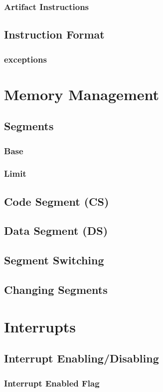 \documentclass[oneside, a4paper]{memoir}
\begin{document}
\subsection{Artifact Instructions}
\section{Instruction Format}
\subsection{exceptions}

\chapter{Memory Management}
\section{Segments}
\subsection{Base}
\subsection{Limit}
\section{Code Segment (CS)}
\section{Data Segment (DS)}
\section{Segment Switching}
\section{Changing Segments}

\chapter{Interrupts}
\section{Interrupt Enabling/Disabling}
\subsection{Interrupt Enabled Flag}
\end{document}
